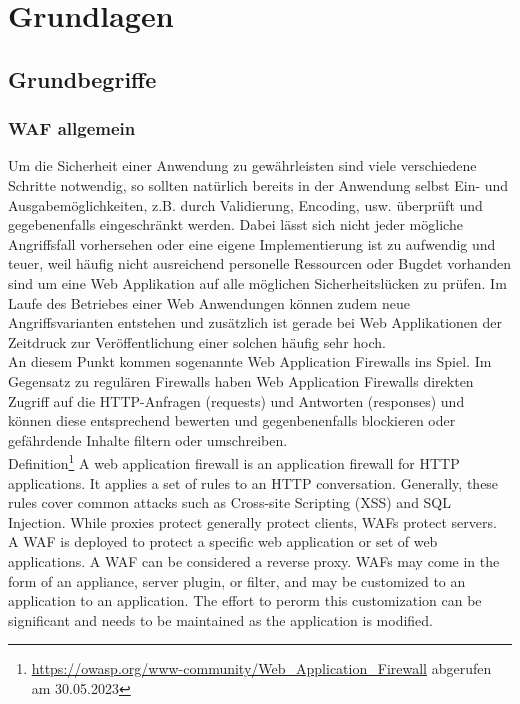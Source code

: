 \chapter{Grundlagen}


\section{Grundbegriffe}
\subsection{WAF allgemein}
Um die Sicherheit einer Anwendung zu gewährleisten sind viele verschiedene Schritte notwendig, so sollten natürlich bereits in der Anwendung selbst Ein- und Ausgabemöglichkeiten, z.B. durch Validierung, Encoding, usw. überprüft und gegebenenfalls eingeschränkt werden. Dabei lässt sich nicht jeder mögliche Angriffsfall vorhersehen oder eine eigene Implementierung ist zu aufwendig und teuer, weil häufig nicht ausreichend personelle Ressourcen oder Bugdet vorhanden sind um eine Web Applikation auf alle möglichen Sicherheitslücken zu prüfen. Im Laufe des Betriebes einer Web Anwendungen können zudem neue Angriffsvarianten entstehen und zusätzlich ist gerade bei Web Applikationen der Zeitdruck zur Veröffentlichung einer solchen häufig sehr hoch.\\

An diesem Punkt kommen sogenannte Web Application Firewalls ins Spiel. Im Gegensatz zu regulären Firewalls haben Web Application Firewalls direkten Zugriff auf die HTTP-Anfragen (requests) und Antworten (responses) und können diese entsprechend bewerten und gegenbenenfalls blockieren oder gefährdende Inhalte filtern oder umschreiben.\\

\textcolor{bhtGray}{ Definition\footnote{\url{https://owasp.org/www-community/Web_Application_Firewall} abgerufen am 30.05.2023}} A web application firewall is an application firewall for HTTP applications. It applies a set of rules to an HTTP conversation. Generally, these rules cover common attacks such as Cross-site Scripting (XSS) and SQL Injection. While proxies protect generally protect clients, WAFs protect servers. A WAF is deployed to protect a specific web application or set of web applications. A WAF can be considered a reverse proxy. WAFs may come in the form of an appliance, server plugin, or filter, and may be customized to an application to an application. The effort to perorm this customization can be significant and needs to be maintained as the application is modified.

